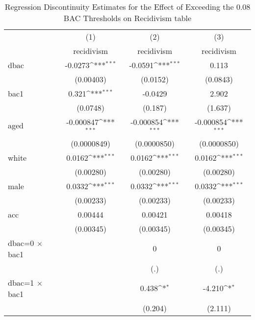 \begin{table}[htbp]\centering
\def\sym#1{\ifmmode^{#1}\else\(^{#1}\)\fi}
\caption{Regression Discontinuity Estimates for the Effect of Exceeding the 0.08 BAC Thresholds on Recidivism table\label{tab1}}
\begin{tabular}{l*{3}{c}}
\hline\hline
                    &\multicolumn{1}{c}{(1)}&\multicolumn{1}{c}{(2)}&\multicolumn{1}{c}{(3)}\\
                    &\multicolumn{1}{c}{recidivism}&\multicolumn{1}{c}{recidivism}&\multicolumn{1}{c}{recidivism}\\
\hline
dbac                &     -0.0273\sym{***}&     -0.0591\sym{***}&       0.113         \\
                    &   (0.00403)         &    (0.0152)         &    (0.0843)         \\
[1em]
bac1                &       0.321\sym{***}&     -0.0429         &       2.902         \\
                    &    (0.0748)         &     (0.187)         &     (1.637)         \\
[1em]
aged                &   -0.000847\sym{***}&   -0.000854\sym{***}&   -0.000854\sym{***}\\
                    & (0.0000849)         & (0.0000850)         & (0.0000850)         \\
[1em]
white               &      0.0162\sym{***}&      0.0162\sym{***}&      0.0162\sym{***}\\
                    &   (0.00280)         &   (0.00280)         &   (0.00280)         \\
[1em]
male                &      0.0332\sym{***}&      0.0332\sym{***}&      0.0332\sym{***}\\
                    &   (0.00233)         &   (0.00233)         &   (0.00233)         \\
[1em]
acc                 &     0.00444         &     0.00421         &     0.00418         \\
                    &   (0.00345)         &   (0.00345)         &   (0.00345)         \\
[1em]
dbac=0 $\times$ bac1&                     &           0         &           0         \\
                    &                     &         (.)         &         (.)         \\
[1em]
dbac=1 $\times$ bac1&                     &       0.438\sym{*}  &      -4.210\sym{*}  \\
                    &                     &     (0.204)         &     (2.111)         \\

\end{tabular}
\end{table}
